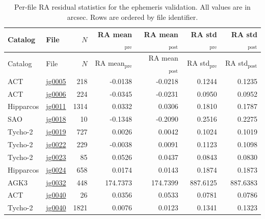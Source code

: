 {\footnotesize
\setlength{\LTleft}{0pt}
\setlength{\LTright}{0pt}
\setlength{\tabcolsep}{5pt}
\begin{longtable}{llrrrrr}
\caption{Per-file RA residual statistics for the ephemeris validation. All values are in arcsec. Rows are ordered by file identifier.}\label{tab:ephem_per_file_ra}\\
\hline
Catalog & File & $N$ & RA mean$_\mathrm{pre}$ & RA mean$_\mathrm{post}$ & RA std$_\mathrm{pre}$ & RA std$_\mathrm{post}$ \\
\hline
\endfirsthead
\hline
Catalog & File & $N$ & RA mean$_\mathrm{pre}$ & RA mean$_\mathrm{post}$ & RA std$_\mathrm{pre}$ & RA std$_\mathrm{post}$ \\
\hline
\endhead
\hline
\endfoot
ACT & \href{https://www.sai.msu.ru/neb/nss/html/obspos/OBS_COLL/J/jg0005.html}{jg0005} & 218 & -0.0138 & -0.0218 & 0.1244 & 0.1235 \\
ACT & \href{https://www.sai.msu.ru/neb/nss/html/obspos/OBS_COLL/J/jg0006.html}{jg0006} & 224 & -0.0345 & -0.0231 & 0.0950 & 0.0952 \\
Hipparcos & \href{https://www.sai.msu.ru/neb/nss/html/obspos/OBS_COLL/J/jg0011.html}{jg0011} & 1314 & 0.0332 & 0.0306 & 0.1810 & 0.1787 \\
SAO & \href{https://www.sai.msu.ru/neb/nss/html/obspos/OBS_COLL/J/jg0018.html}{jg0018} & 10 & -0.1348 & -0.2090 & 0.2516 & 0.2275 \\
Tycho-2 & \href{https://www.sai.msu.ru/neb/nss/html/obspos/OBS_COLL/J/jg0019.html}{jg0019} & 727 & 0.0026 & 0.0042 & 0.1024 & 0.1019 \\
Tycho-2 & \href{https://www.sai.msu.ru/neb/nss/html/obspos/OBS_COLL/J/jg0022.html}{jg0022} & 229 & -0.0038 & 0.0091 & 0.1123 & 0.1098 \\
Tycho-2 & \href{https://www.sai.msu.ru/neb/nss/html/obspos/OBS_COLL/J/jg0023.html}{jg0023} & 85 & 0.0526 & 0.0437 & 0.0843 & 0.0830 \\
Hipparcos & \href{https://www.sai.msu.ru/neb/nss/html/obspos/OBS_COLL/J/jg0024.html}{jg0024} & 658 & 0.0174 & 0.0143 & 0.1874 & 0.1873 \\
AGK3 & \href{https://www.sai.msu.ru/neb/nss/html/obspos/OBS_COLL/J/jg0032.html}{jg0032} & 448 & 174.7373 & 174.7399 & 887.6125 & 887.6383 \\
ACT & \href{https://www.sai.msu.ru/neb/nss/html/obspos/OBS_COLL/J/jg0040.html}{jg0040} & 26 & 0.0356 & 0.0533 & 0.0781 & 0.0786 \\
Tycho-2 & \href{https://www.sai.msu.ru/neb/nss/html/obspos/OBS_COLL/J/jg0040.html}{jg0040} & 1821 & 0.0076 & 0.0123 & 0.1341 & 0.1323 \\

\end{longtable}}
